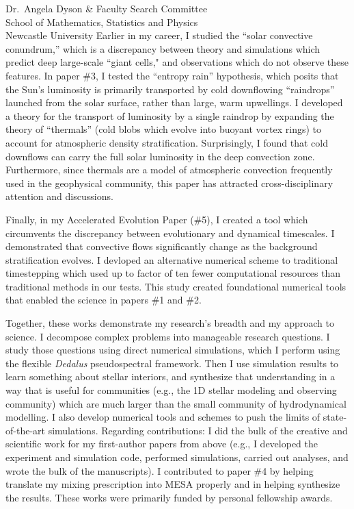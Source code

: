 \documentclass[12pt, a4paper]{letter}
\begin{document}
\begin{letter}{
        Dr.~Angela Dyson \& Faculty Search Committee \\
        School of Mathematics, Statistics and Physics \\
        Newcastle University}
    Earlier in my career, I studied the ``solar convective conundrum,'' which is a discrepancy between theory and simulations which predict deep large-scale ``giant cells," and observations which do not observe these features.
    In paper \#3, I tested the ``entropy rain'' hypothesis, which posits that the Sun’s luminosity is primarily transported by cold downflowing ``raindrops'' launched from the solar surface, rather than large, warm upwellings. 
    I developed a theory for the transport of luminosity by a single raindrop by expanding the theory of ``thermals'' (cold blobs which evolve into buoyant vortex rings) to account for atmospheric density stratification.
    Surprisingly, I found that cold downflows can carry the full solar luminosity in the deep convection zone.
    Furthermore, since thermals are a model of atmospheric convection frequently used in the geophysical community, this paper has attracted cross-disciplinary attention and discussions.

    Finally, in my Accelerated Evolution Paper (\#5), I created a tool which circumvents the discrepancy between evolutionary and dynamical timescales.
    I demonstrated that convective flows significantly change as the background stratification evolves.
    I devloped an alternative numerical scheme to traditional timestepping which used up to factor of ten fewer computational resources than traditional methods in our tests. 
    This study created foundational numerical tools that enabled the science in papers \#1 and \#2.

    Together, these works demonstrate my research's breadth and my approach to science.
    I decompose complex problems into manageable research questions.
    I study those questions using direct numerical simulations, which I perform using the flexible \emph{Dedalus} pseudospectral framework. 
    Then I use simulation results to learn something about stellar interiors, and synthesize that understanding in a way that is useful for communities (e.g., the 1D stellar modeling and observing community) which are much larger than the small community of hydrodynamical modelling.
    I also develop numerical tools and schemes to push the limits of state-of-the-art simulations.
    Regarding contributions: I did the bulk of the creative and scientific work for my first-author papers from above (e.g., I developed the experiment and simulation code, performed simulations, carried out analyses, and wrote the bulk of the manuscripts).
    I contributed to paper \#4 by helping translate my mixing prescription into MESA properly and in helping synthesize the results.
    These works were primarily funded by personal fellowship awards.



\end{letter}
\end{document}
